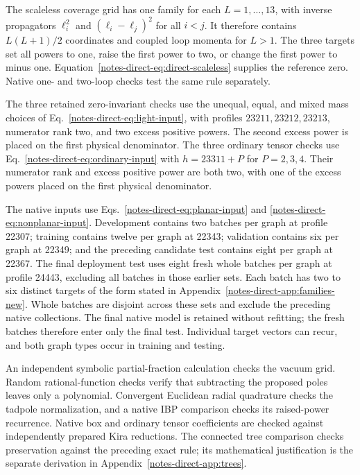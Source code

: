\documentclass[11pt,a4paper]{article}
\begin{document}
The scaleless coverage grid has one family for each $L=1,\ldots,13$, with inverse propagators $\ell_i^2$ and $(\ell_i-\ell_j)^2$ for all $i<j$. It therefore contains $L(L+1)/2$ coordinates and coupled loop momenta for $L>1$. The three targets set all powers to one, raise the first power to two, or change the first power to minus one. Equation~\eqref{notes-direct-eq:direct-scaleless} supplies the reference zero. Native one- and two-loop checks test the same rule separately.

The three retained zero-invariant checks use the unequal, equal, and mixed mass choices of Eq.~\eqref{notes-direct-eq:light-input}, with profiles $23211,23212,23213$, numerator rank two, and two excess positive powers. The second excess power is placed on the first physical denominator. The three ordinary tensor checks use Eq.~\eqref{notes-direct-eq:ordinary-input} with $h=23311+P$ for $P=2,3,4$. Their numerator rank and excess positive power are both two, with one of the excess powers placed on the first physical denominator.

The native inputs use Eqs.~\eqref{notes-direct-eq:planar-input} and \eqref{notes-direct-eq:nonplanar-input}. Development contains two batches per graph at profile 22307; training contains twelve per graph at 22343; validation contains six per graph at 22349; and the preceding candidate test contains eight per graph at 22367. The final deployment test uses eight fresh whole batches per graph at profile 24443, excluding all batches in those earlier sets. Each batch has two to six distinct targets of the form stated in Appendix~\ref{notes-direct-app:families-new}. Whole batches are disjoint across these sets and exclude the preceding native collections. The final native model is retained without refitting; the fresh batches therefore enter only the final test. Individual target vectors can recur, and both graph types occur in training and testing.

An independent symbolic partial-fraction calculation checks the vacuum grid. Random rational-function checks verify that subtracting the proposed poles leaves only a polynomial. Convergent Euclidean radial quadrature checks the tadpole normalization, and a native IBP comparison checks its raised-power recurrence. Native box and ordinary tensor coefficients are checked against independently prepared Kira reductions. The connected tree comparison checks preservation against the preceding exact rule; its mathematical justification is the separate derivation in Appendix~\ref{notes-direct-app:trees}.
\end{document}
